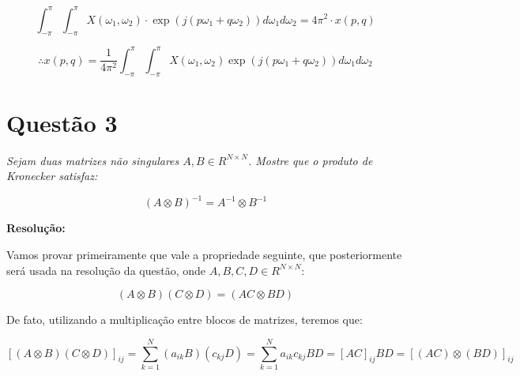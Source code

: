 \documentclass[]{abntex2}
\begin{document}
\begin{equation*}
	\int_{-\pi}^{\pi} \int_{-\pi}^{\pi}X(\omega_1, \omega_2) \cdot \exp \left( j (p \omega_1 + q \omega_2) \right)d\omega_1 d\omega_2 = 4\pi^{2}\cdot x(p,q)
\end{equation*}

\begin{tcolorbox}
	\[
		\therefore x(p, q) = \frac{1}{4\pi^2} \int_{-\pi}^{\pi} \int_{-\pi}^{\pi} X(\omega_1, \omega_2) \exp \left( j (p \omega_1 + q \omega_2) \right) d\omega_1 d\omega_2
	\]
	\end{tcolorbox}


\section*{\textbf{Questão 3}}

\textit{Sejam duas matrizes não singulares $A,B \in R^{N \times N}$. Mostre que o produto de Kronecker satisfaz:}

\begin{equation}
	{(A \otimes B)}^{-1} = A^{-1} \otimes B^{-1}
\end{equation}

\textbf{Resolução:}

Vamos provar primeiramente que vale a propriedade seguinte, que posteriormente será usada na resolução da questão, onde $A,B,C,D \in R^{N \times N}$:

\begin{equation*}
	(A \otimes B)(C \otimes D) = (AC \otimes BD)
\end{equation*}

De fato, utilizando a multiplicação entre blocos de matrizes, teremos que:

\begin{equation*}
	{[(A \otimes B)(C \otimes D)]}_{ij} = \sum_{k=1}^{N} (a_{ik}B)(c_{kj}D) = \sum_{k=1}^{N} a_{ik}c_{kj}BD = {[AC]}_{ij} BD =  {[(AC) \otimes (BD)]}_{ij}
\end{equation*}
\end{document}
